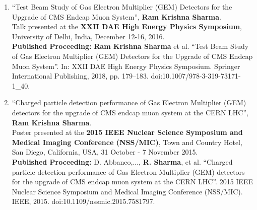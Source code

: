 \begin{enumerate}
	\item ``Test Beam Study of Gas Electron Multiplier (GEM) Detectors for the Upgrade of CMS Endcap Muon System'', {\textbf{Ram Krishna Sharma}}.\\
	Talk presented at the \textbf{XXII DAE High Energy Physics Symposium}, University of Delhi, India, December 12-16, 2016.\\
	\textbf{Published Proceeding:} \textbf{Ram Krishna Sharma} et al. “Test Beam Study of Gas Electron Multiplier (GEM) Detectors for the Upgrade of CMS Endcap Muon System”. In: XXII DAE High Energy Physics Symposium. Springer International Publishing, 2018, pp. 179–183. doi:10.1007/978-3-319-73171-1\_40.

	\item ``Charged particle detection performance of Gas Electron Multiplier (GEM) detectors for the upgrade of CMS endcap muon system at the CERN LHC'', \textbf{Ram Krishna Sharma}.\\
	Poster presented at the \textbf{2015 IEEE Nuclear Science Symposium and Medical Imaging Conference (NSS/MIC)}, Town and Country Hotel, San Diego, California, USA, 31 October - 7 November 2015.\\
	\textbf{Published Proceeding:} D. Abbaneo,..., \textbf{R. Sharma}, et al. “Charged particle detection performance of Gas Electron Multiplier (GEM) detectors for the upgrade of CMS endcap muon system at the CERN LHC”. 2015 IEEE Nuclear Science Symposium and Medical Imaging Conference (NSS/MIC). IEEE, 2015. doi:10.1109/nssmic.2015.7581797.

\end{enumerate}
